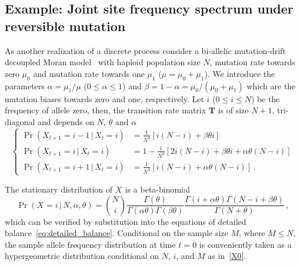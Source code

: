 \documentclass[preprint]{elsarticle}
\newcommand\given{{\,|\,}}
\newcommand\x[1]{\ensuremath{X_{#1}}}
\begin{document}
\subsection{Example: Joint site frequency spectrum under reversible mutation}\label{section:discr_rev_general}
As another realization of a discrete process consider a bi-allelic mutation-drift decoupled Moran model~\citep{Baak08,Ethe09} with haploid population size $N$, mutation rate towards zero $\mu_0$ and mutation rate towards one $\mu_1$ ($\mu=\mu_0+\mu_1$).  We introduce the parameters $\alpha=\mu_1/\mu$ ($0 \leq \alpha \leq 1$) and $\beta=1-\alpha=\mu_0/(\mu_0+\mu_1)$ which are the mutation biases towards zero and one, respectively.
Let $i$ ($0\leq i\leq N$) be the frequency of allele zero, then, the transition rate matrix $\mathbf{T}$ is of size $N+1$, tri-diagonal and depends on $N$, $\theta$ and $\alpha$
\begin{equation}\label{eq:transition_decoupled_Moran}
\begin{cases}
\Pr(\x{t+1}=i-1\given \x{t}=i)&=\frac1{N^2}\left[i(N-i)+\beta\theta i\right]\\
    \Pr(\x{t+1}=i\given \x{t}=i)&=1-\frac1{N^2}\left[2i(N-i)+\beta\theta i + \alpha\theta (N-i) \right]\\
\Pr(\x{t+1}=i+1\given \x{t}=i)&=\frac1{N^2}\left[i(N-i)+\alpha\theta (N-i)\right]\,.
\end{cases}
\end{equation}

The stationary distribution of $\x{}$ is a beta-binomial
\begin{equation}\label{beta_bin}
\Pr(\x{}=i\given N,\alpha,\theta)=\binom{N}{i}
\frac{\Gamma(\theta)}{\Gamma(\alpha\theta)\Gamma(\beta\theta)}
\frac{\Gamma(i+\alpha\theta)\Gamma(N-i+\beta\theta)}{\Gamma(N+\theta)}\,,
\end{equation}
which can be verified by substitution into the equations of detailed balance~\eqref{eq:detailed_balance}. 
Conditional on the sample size $M$, where $M\leq N$, the sample allele frequency distribution at time $t=0$ is conveniently taken as a hypergeometric distribution conditional on $N$, $i$, and $M$ as in~\eqref{X0}.

\end{document}
